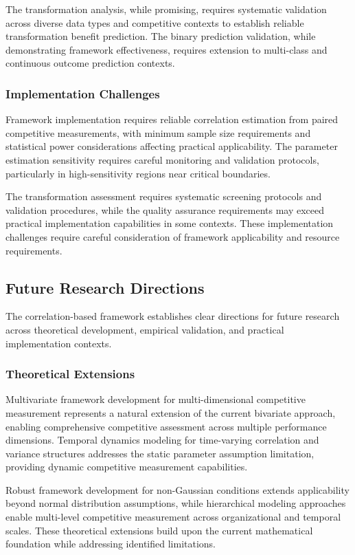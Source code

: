 The transformation analysis, while promising, requires systematic validation across diverse data types and competitive contexts to establish reliable transformation benefit prediction. The binary prediction validation, while demonstrating framework effectiveness, requires extension to multi-class and continuous outcome prediction contexts.

\subsubsection{Implementation Challenges}

Framework implementation requires reliable correlation estimation from paired competitive measurements, with minimum sample size requirements and statistical power considerations affecting practical applicability. The parameter estimation sensitivity requires careful monitoring and validation protocols, particularly in high-sensitivity regions near critical boundaries.

The transformation assessment requires systematic screening protocols and validation procedures, while the quality assurance requirements may exceed practical implementation capabilities in some contexts. These implementation challenges require careful consideration of framework applicability and resource requirements.

\subsection{Future Research Directions}

The correlation-based framework establishes clear directions for future research across theoretical development, empirical validation, and practical implementation contexts.

\subsubsection{Theoretical Extensions}

Multivariate framework development for multi-dimensional competitive measurement represents a natural extension of the current bivariate approach, enabling comprehensive competitive assessment across multiple performance dimensions. Temporal dynamics modeling for time-varying correlation and variance structures addresses the static parameter assumption limitation, providing dynamic competitive measurement capabilities.

Robust framework development for non-Gaussian conditions extends applicability beyond normal distribution assumptions, while hierarchical modeling approaches enable multi-level competitive measurement across organizational and temporal scales. These theoretical extensions build upon the current mathematical foundation while addressing identified limitations.


